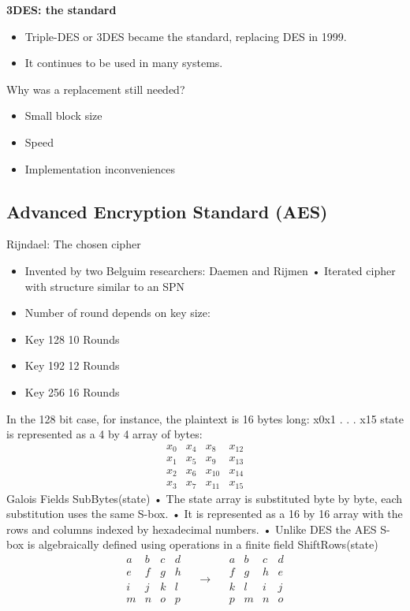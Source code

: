 \textbf{3DES: the standard}
\begin{itemize}
    \item Triple-DES or 3DES became the standard, replacing DES in 1999.
    \item It continues to be used in many systems.
\end{itemize}
Why was a replacement still needed?
\begin{itemize}
    \item Small block size
    \item Speed
    \item Implementation inconveniences
\end{itemize}

\subsection{Advanced Encryption Standard (AES)}
Rijndael: The chosen cipher
\begin{itemize}
    \item Invented by two Belguim researchers: Daemen and Rijmen • Iterated cipher with structure similar to an SPN
\item Number of round depends on key size:
\item Key 128 10 Rounds
\item Key 192 12 Rounds
\item Key 256 16 Rounds
\end{itemize}
In the 128 bit case, for instance, the plaintext is 16 bytes long: x0x1 . . . x15 state is represented as a 4 by 4 array of bytes:
$$
\begin{matrix}
    x_{0} & x_{4} & x_{8}  & x_{12} \\
    x_{1} & x_{5} & x_{9}  & x_{13} \\
    x_{2} & x_{6} & x_{10} & x_{14} \\
    x_{3} & x_{7} & x_{11} & x_{15}
\end{matrix}
$$
Galois Fields
SubBytes(state)
• The state array is substituted byte by byte, each substitution uses the same S-box.
• It is represented as a 16 by 16 array with the rows and columns indexed by hexadecimal
numbers.
• Unlike DES the AES S-box is algebraically defined using operations in a finite field
ShiftRows(state)
$$
\begin{matrix}
    a & b & c & d \\
    e & f & g & h \\
    i & j & k & l \\
    m & n & o & p
\end{matrix}
\quad\longrightarrow\quad
\begin{matrix}
    a & b & c & d \\
    f & g & h & e \\
    k & l & i & j \\
    p & m & n & o
\end{matrix}
$$
